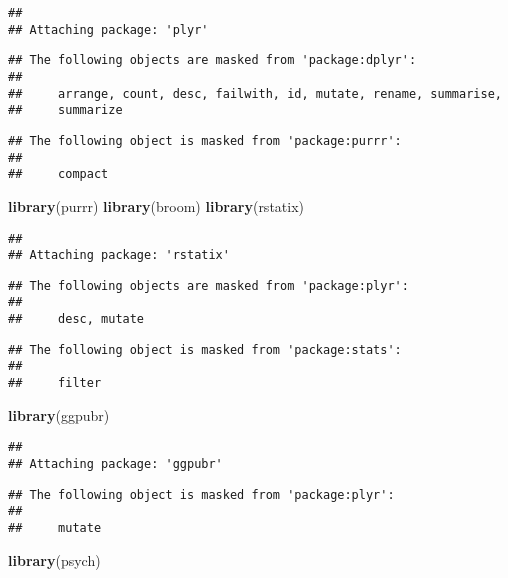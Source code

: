 \documentclass[]{article}
\newenvironment{Shaded}{\begin{snugshade}}{\end{snugshade}}
\newcommand{\KeywordTok}[1]{\textcolor[rgb]{0.13,0.29,0.53}{\textbf{#1}}}
\newcommand{\NormalTok}[1]{#1}
\begin{document}
\begin{verbatim}
## 
## Attaching package: 'plyr'
\end{verbatim}

\begin{verbatim}
## The following objects are masked from 'package:dplyr':
## 
##     arrange, count, desc, failwith, id, mutate, rename, summarise,
##     summarize
\end{verbatim}

\begin{verbatim}
## The following object is masked from 'package:purrr':
## 
##     compact
\end{verbatim}

\begin{Shaded}
\begin{Highlighting}[]
\KeywordTok{library}\NormalTok{(purrr)}
\KeywordTok{library}\NormalTok{(broom)}
\KeywordTok{library}\NormalTok{(rstatix)}
\end{Highlighting}
\end{Shaded}

\begin{verbatim}
## 
## Attaching package: 'rstatix'
\end{verbatim}

\begin{verbatim}
## The following objects are masked from 'package:plyr':
## 
##     desc, mutate
\end{verbatim}

\begin{verbatim}
## The following object is masked from 'package:stats':
## 
##     filter
\end{verbatim}

\begin{Shaded}
\begin{Highlighting}[]
\KeywordTok{library}\NormalTok{(ggpubr)}
\end{Highlighting}
\end{Shaded}

\begin{verbatim}
## 
## Attaching package: 'ggpubr'
\end{verbatim}

\begin{verbatim}
## The following object is masked from 'package:plyr':
## 
##     mutate
\end{verbatim}

\begin{Shaded}
\begin{Highlighting}[]
\KeywordTok{library}\NormalTok{(psych)}
\end{Highlighting}
\end{Shaded}
\end{document}
